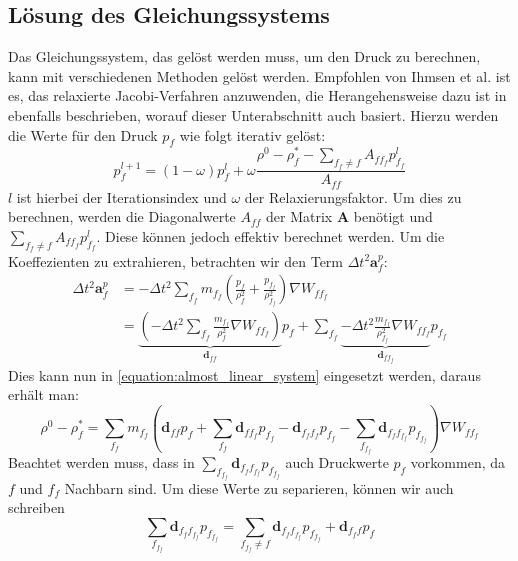 \documentclass[11pt,
a4paper,
parskip=half, %
BCOR=10mm, %
english,
ngerman]{scrreprt}
\begin{document}
\subsection{Lösung des Gleichungssystems}
Das Gleichungssystem, das gelöst werden muss, um den Druck zu berechnen, kann mit verschiedenen Methoden gelöst werden.
Empfohlen von Ihmsen et al. \cite{ihmsen_implicit_2014} ist es, das relaxierte Jacobi-Verfahren anzuwenden,
die Herangehensweise dazu ist in \cite{ihmsen_implicit_2014} ebenfalls beschrieben, worauf dieser Unterabschnitt auch basiert.
Hierzu werden die Werte für den Druck $p_f$ wie folgt iterativ gelöst:
\begin{equation}
    \label{equation:iterative_pressure_update}
    p_f^{l+1} = (1 - \omega) p_f^l + \omega \frac{\rho^0 - \rho_f^* - \sum_{f_f \neq f} A_{ff_f} p_{f_f}^l}{A_{ff}}
\end{equation}
$l$ ist hierbei der Iterationsindex und $\omega$ der Relaxierungsfaktor.
Um dies zu berechnen, werden die Diagonalwerte $A_{ff}$ der Matrix $\textbf{A}$ benötigt und $\sum_{f_f \neq f} A_{ff_f} p_{f_f}^l$.
Diese können jedoch effektiv berechnet werden.
Um die Koeffezienten zu extrahieren, betrachten wir den Term $\Delta t^2 \textbf{a}_f^p$:
\begin{align}
    \Delta t^2 \textbf{a}_f^p &= -\Delta t^2 \sum_{f_f} m_{f_f} \left(\frac{p_f}{\rho_f^2} + \frac{p_{f_f}}{\rho_{f_f}^2}\right) \nabla W_{ff_f}\\
        &= \underbrace{\left(-\Delta t^2 \sum_{f_f} \frac{m_{f_f}}{\rho_f^2} \nabla W_{ff_f}\right)}_{\textbf{d}_{ff}} p_f
            + \sum_{f_f} \underbrace{-\Delta t^2 \frac{m_{f_f}}{\rho_{f_f}^2} \nabla W_{ff_f}}_{\textbf{d}_{ff_f}} p_{f_f}
\end{align}
Dies kann nun in \eqref{equation:almost_linear_system} eingesetzt werden, daraus erhält man:
\begin{equation}
    \label{equation:density_difference_not_seperated}
    \rho^0 - \rho_f^* =
     \sum_{f_f} m_{f_f} \left(\textbf{d}_{ff} p_f + \sum_{f_f} \textbf{d}_{ff_f} p_{f_f}
     - \textbf{d}_{f_f f_f} p_{f_f} - \sum_{f_{f_f}} \textbf{d}_{f_f f_{f_f}} p_{f_{f_f}}\right) \nabla W_{ff_f}
\end{equation}
Beachtet werden muss, dass in $\sum_{f_{f_f}} \textbf{d}_{f_f f_{f_f}} p_{f_{f_f}}$ auch Druckwerte $p_f$ vorkommen, da $f$ und $f_f$ Nachbarn sind.
Um diese Werte zu separieren, können wir auch schreiben
\begin{equation}
    \sum_{f_{f_f}} \textbf{d}_{f_f f_{f_f}} p_{f_{f_f}} = \sum_{f_{f_f} \neq f} \textbf{d}_{f_f f_{f_f}} p_{f_{f_f}} + \textbf{d}_{f_f f} p_f
\end{equation}
\end{document}
